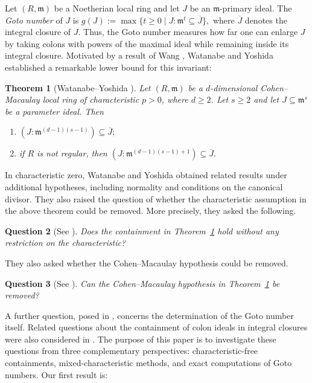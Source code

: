 \documentclass[11pt,a4paper]{amsart}
\numberwithin{equation}{section}
\newtheorem{theorem}{Theorem}[section]
\newtheorem{question}[theorem]{Question}
\begin{document}
Let $(R,\mathfrak m)$ be a Noetherian local ring and let $J$ be an
$\mathfrak m$-primary ideal. The \emph{Goto number} of $J$ is
$ g(J):=\max\{t\geq 0\mid J:\mathfrak m^t\subseteq\overline J\}, $
where $\overline J$ denotes the integral closure of $J$.
Thus, the Goto number measures how far one can enlarge $J$ by
taking colons with powers of the maximal ideal while remaining
inside its integral closure.
Motivated by a result of Wang \cite{Wang}, Watanabe and Yoshida
established a remarkable lower bound for this invariant:
\begin{theorem}[Watanabe--Yoshida {\cite[Theorem 6.2]{WY}}]
	\label{thm:WY}
	Let $(R,\mathfrak m)$ be a $d$-dimensional Cohen--Macaulay local
	ring of characteristic $p>0$, where $d\geq 2$. Let $s\geq 2$
	and let $J\subseteq\mathfrak m^s$ be a parameter ideal. Then
	\begin{enumerate}[label=\textup{(\roman*)}]
		\item
		$(J:\mathfrak m^{(d-1)(s-1)})\subseteq\overline J;$
		\item if $R$ is not regular, then
		$	(J:\mathfrak m^{(d-1)(s-1)+1})\subseteq\overline J.$
	\end{enumerate}
\end{theorem}



In characteristic zero, Watanabe and Yoshida obtained related
results under additional hypotheses, including normality and
conditions on the canonical divisor. They also raised the question
of whether the characteristic assumption in the above theorem
could be removed. More precisely, they asked the following.

\begin{question}[See {\cite[Question 8.1]{WY}}]
	\label{q:charfree}
	Does the containment in Theorem~\ref{thm:WY} hold without any
	restriction on the characteristic?
\end{question}

They also asked whether the Cohen--Macaulay hypothesis could
be removed.

\begin{question}[See {\cite[Question 8.2]{WY}}]
	\label{q:nonCM}
	Can the Cohen--Macaulay hypothesis in Theorem~\ref{thm:WY}
	be removed?
\end{question}

A further question, posed in \cite[Question 1.2]{WY}, concerns
the determination of the Goto number itself. Related questions
about the containment of colon ideals in integral closures were
also considered in \cite{it}.
The purpose of this paper is to investigate these questions from
three complementary perspectives: characteristic-free
containments, mixed-characteristic methods, and exact
computations of Goto numbers.
Our first result is: 
\end{document}
